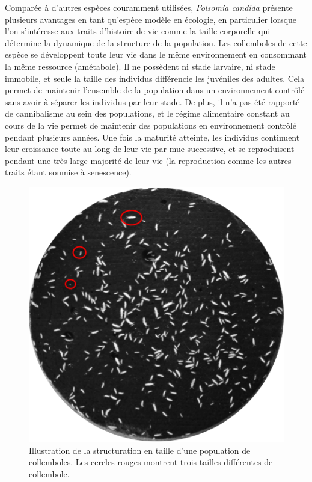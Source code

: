 Comparée à d'autres espèces couramment utilisées, \textit{Folsomia candida}
présente plusieurs avantages en tant qu'espèce modèle en écologie, en
particulier lorsque l'on s'intéresse aux traits d'histoire de vie comme la
taille corporelle qui détermine la dynamique de la structure de la population.
Les collemboles de cette espèce se développent toute leur vie dans le même
environnement en consommant la même ressource (amétabole). Il ne possèdent ni
stade larvaire, ni stade immobile, et seule la taille des individus différencie
les juvéniles des adultes. Cela permet de maintenir l'ensemble de la population
dans un environnement contrôlé sans avoir à séparer les individus par leur
stade. De plus, il n'a pas été rapporté de cannibalisme au sein des populations,
et le régime alimentaire constant au cours de la vie permet de maintenir des
populations en environnement contrôlé pendant plusieurs années. Une fois la
maturité atteinte, les individus continuent leur croissance toute au long de
leur vie par mue successive, et se reproduisent pendant une très large majorité
de leur vie (la reproduction comme les autres traits étant soumise à
senescence). 

\begin{figure}[!ht]
\begin{center}
\includegraphics{1_CorpsDeThese/Methodo/StrucTaille}
\caption[ structuration en taille
d'une population de collemboles.]{Illustration de la structuration en taille
d'une population de collemboles. Les cercles rouges montrent trois tailles
différentes de collembole.}
\label{fig:strucpop}
\end{center}
\end{figure}

